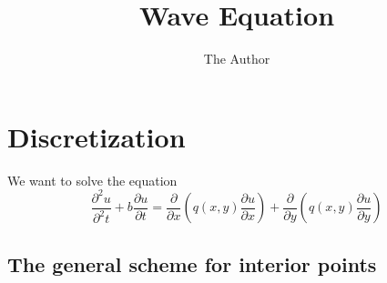\documentclass[11pt]{article} %
\title{Wave Equation}
\author{The Author}
\newcommand{\dutt}{\frac{\partial^2u}{\partial^2t}}
\newcommand{\dut}{\frac{\partial u}{\partial t}}
\newcommand{\dux}{\frac{\partial u}{\partial x}}
\newcommand{\duy}{\frac{\partial u}{\partial y}}
\newcommand{\dx}{\frac{\partial}{\partial x}}
\newcommand{\dy}{\frac{\partial}{\partial y}}
\begin{document}
\maketitle

\section*{Discretization}
We want to solve the equation
\begin{equation}
\dutt + b\dut = \dx\left(q(x,y) \dux\right) + \dy\left(q(x,y) \duy\right)
\label{wave_eq}
\end{equation}

\subsection*{The general scheme for interior points}
\end{document}

